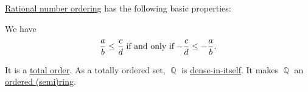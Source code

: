 \begin{proposition}\label{thm:def:rational_number_ordering}
  \hyperref[def:rational_number_ordering]{Rational number ordering} has the following basic properties:
  \begin{thmenum}
     We have
    \begin{equation*}
      \frac a b \leq \frac c d \T{if and only if} -\frac c d \leq -\frac a b.
    \end{equation*}

     It is a \hyperref[def:totally_ordered_set]{total order}.
     As a totally ordered set, \( \BbbQ \) is \hyperref[def:dense_total_order]{dense-in-itself}.
     It makes \( \BbbQ \) an \hyperref[def:ordered_semiring]{ordered (semi)ring}.
  \end{thmenum}
\end{proposition}
